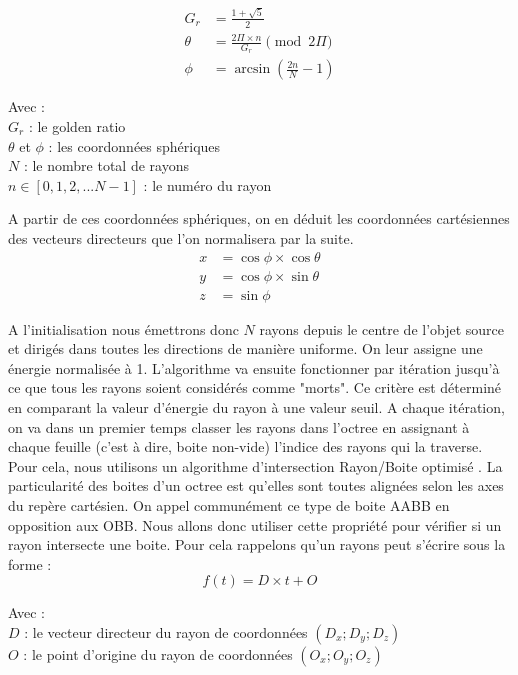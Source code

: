 \begin{align}
G_r &= \frac{1 + \sqrt{5}}{2} \\
\theta &= \frac{2 \Pi \times n}{G_r}  \pmod{2\Pi} \\
\phi &= \arcsin{(\frac{2n}{N}-1)} 
\end{align}

Avec : \\
$G_r$ : le golden ratio \\
$\theta$ et $\phi$ : les coordonnées sphériques \\
$N$ : le nombre total de rayons \\
$n \in[0, 1, 2, ... N-1]$ : le numéro du rayon 

A partir de ces coordonnées sphériques, on en déduit les coordonnées cartésiennes des vecteurs directeurs que l'on normalisera par la suite.
\begin{align}
x &= \cos{\phi} \times \cos{\theta} \\
y &= \cos{\phi} \times \sin{\theta} \\
z &= \sin{\phi}
\end{align}


A l'initialisation nous émettrons donc $N$ rayons depuis le centre de l'objet source et dirigés dans toutes les directions de manière uniforme. On leur assigne une énergie normalisée à 1. L'algorithme va ensuite fonctionner par itération jusqu'à ce que tous les rayons soient considérés comme "morts". Ce critère est déterminé en comparant la valeur d'énergie du rayon à une valeur seuil. A chaque itération, on va dans un premier temps classer les rayons dans l'octree en assignant à chaque feuille (c'est à dire, boite non-vide) l'indice des rayons qui la traverse. Pour cela, nous utilisons un algorithme d'intersection Rayon/Boite optimisé \cite{AABB}. La particularité des boites d'un octree est qu'elles sont toutes alignées selon les axes du repère cartésien. On appel communément ce type de boite \gls{AABB} en opposition aux \gls{OBB}. Nous allons donc utiliser cette propriété pour vérifier si un rayon intersecte une boite. Pour cela rappelons qu'un rayons peut s'écrire sous la forme : 
\begin{equation}
f(t) = D \times t + O
\end{equation}

Avec : \\
$D$ : le vecteur directeur du rayon de coordonnées $(D_x ; D_y ; D_z)$ \\
$O$ : le point d'origine du rayon de coordonnées $(O_x ; O_y ; O_z)$

